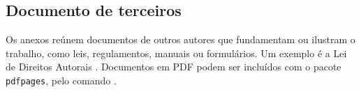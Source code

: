 \begin{anexosenv}
	\partanexos

	\chapter{Documento de terceiros}\label{anexo:lei}

	Os anexos reúnem documentos de outros autores que fundamentam ou ilustram o trabalho, como leis, regulamentos, manuais ou formulários. Um exemplo é a Lei de Direitos Autorais \cite{brasil1998}. Documentos em PDF podem ser incluídos com o pacote \texttt{pdfpages}, pelo comando \verb||.
\end{anexosenv}
